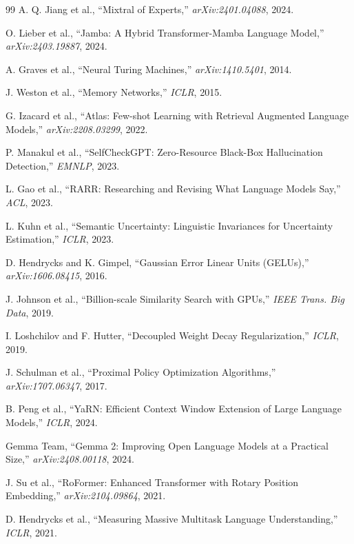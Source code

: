 \documentclass{article}
\begin{document}
\begin{thebibliography}{99}
A. Q. Jiang et al., ``Mixtral of Experts,'' \textit{arXiv:2401.04088}, 2024.

O. Lieber et al., ``Jamba: A Hybrid Transformer-Mamba Language Model,'' \textit{arXiv:2403.19887}, 2024.

A. Graves et al., ``Neural Turing Machines,'' \textit{arXiv:1410.5401}, 2014.

J. Weston et al., ``Memory Networks,'' \textit{ICLR}, 2015.

G. Izacard et al., ``Atlas: Few-shot Learning with Retrieval Augmented Language Models,'' \textit{arXiv:2208.03299}, 2022.

P. Manakul et al., ``SelfCheckGPT: Zero-Resource Black-Box Hallucination Detection,'' \textit{EMNLP}, 2023.

L. Gao et al., ``RARR: Researching and Revising What Language Models Say,'' \textit{ACL}, 2023.

L. Kuhn et al., ``Semantic Uncertainty: Linguistic Invariances for Uncertainty Estimation,'' \textit{ICLR}, 2023.

D. Hendrycks and K. Gimpel, ``Gaussian Error Linear Units (GELUs),'' \textit{arXiv:1606.08415}, 2016.

J. Johnson et al., ``Billion-scale Similarity Search with GPUs,'' \textit{IEEE Trans. Big Data}, 2019.

I. Loshchilov and F. Hutter, ``Decoupled Weight Decay Regularization,'' \textit{ICLR}, 2019.

J. Schulman et al., ``Proximal Policy Optimization Algorithms,'' \textit{arXiv:1707.06347}, 2017.

B. Peng et al., ``YaRN: Efficient Context Window Extension of Large Language Models,'' \textit{ICLR}, 2024.

Gemma Team, ``Gemma 2: Improving Open Language Models at a Practical Size,'' \textit{arXiv:2408.00118}, 2024.

J. Su et al., ``RoFormer: Enhanced Transformer with Rotary Position Embedding,'' \textit{arXiv:2104.09864}, 2021.

D. Hendrycks et al., ``Measuring Massive Multitask Language Understanding,'' \textit{ICLR}, 2021.


\end{thebibliography}
\end{document}
